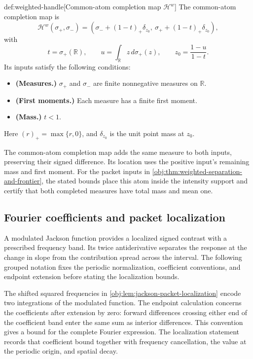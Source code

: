 \begin{definitionv}{def:weighted-handle}[Common-atom completion map \(\mathscr H^w\)]
The common-atom completion map is
\[
\mathscr H^w(\sigma_+,\sigma_-)
=
\left(
\sigma_-+(1-t)_+\delta_{z_0},
\ \sigma_++(1-t)_+\delta_{z_0}
\right),
\]
with
\[
t=\sigma_+(\mathbb R),
\qquad
u=\int_{\mathbb R}z\,d\sigma_+(z),
\qquad
z_0=\frac{1-u}{1-t}.
\]
Its inputs satisfy the following conditions:
\begin{itemize}
\item \textbf{(Measures.)} \(\sigma_+\) and \(\sigma_-\) are finite nonnegative measures on \(\mathbb R\).
\item \textbf{(First moments.)} Each measure has a finite first moment.
\item \textbf{(Mass.)} \(t<1\).
\end{itemize}
Here \((r)_+=\max\{r,0\}\), and \(\delta_{z_0}\) is the unit point mass at \(z_0\).
\end{definitionv}

The common-atom completion map  adds the same measure to both inputs, preserving their signed difference. Its location uses the positive input's remaining mass and first moment. For the packet inputs in \cref{obj:thm:weighted-separation-and-frontier}, the stated bounds place this atom inside the intensity support and certify that both completed measures have total mass and mean one.

\subsection{Fourier coefficients and packet localization}

A modulated Jackson function provides a localized signed contrast with a prescribed frequency band. Its twice antiderivative separates the response at the change in slope from the contribution spread across the interval. The following grouped notation fixes the periodic normalization, coefficient conventions, and endpoint extension before stating the localization bounds.



The shifted squared frequencies in \cref{obj:lem:jackson-packet-localization} encode two integrations of the modulated function. The endpoint calculation concerns the coefficients after extension by zero: forward differences crossing either end of the coefficient band enter the same sum as interior differences. This convention gives a bound for the complete Fourier expression. The localization statement records that coefficient bound together with frequency cancellation, the value at the periodic origin, and spatial decay.

